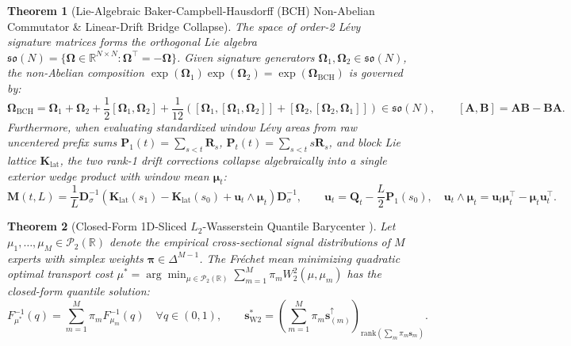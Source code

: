 \documentclass[10pt,a4paper]{article}
\newtheorem{theorem}{Theorem}[section]
\begin{document}
\begin{theorem}[Lie-Algebraic Baker-Campbell-Hausdorff (BCH) Non-Abelian Commutator \& Linear-Drift Bridge Collapse]
The space of order-2 Lévy signature matrices forms the orthogonal Lie algebra $\mathfrak{so}(N) = \{\boldsymbol{\Omega} \in \mathbb{R}^{N \times N} : \boldsymbol{\Omega}^\top = -\boldsymbol{\Omega}\}$. Given signature generators $\boldsymbol{\Omega}_1, \boldsymbol{\Omega}_2 \in \mathfrak{so}(N)$, the non-Abelian composition $\exp(\boldsymbol{\Omega}_1)\exp(\boldsymbol{\Omega}_2) = \exp(\boldsymbol{\Omega}_{\mathrm{BCH}})$ is governed by:
\begin{equation}
  \boldsymbol{\Omega}_{\mathrm{BCH}} = \boldsymbol{\Omega}_1 + \boldsymbol{\Omega}_2 + \frac{1}{2}[\boldsymbol{\Omega}_1, \boldsymbol{\Omega}_2] + \frac{1}{12}\left([\boldsymbol{\Omega}_1, [\boldsymbol{\Omega}_1, \boldsymbol{\Omega}_2]] + [\boldsymbol{\Omega}_2, [\boldsymbol{\Omega}_2, \boldsymbol{\Omega}_1]]\right) \in \mathfrak{so}(N), \qquad [\mathbf{A}, \mathbf{B}] = \mathbf{A}\mathbf{B} - \mathbf{B}\mathbf{A}.
\end{equation}
Furthermore, when evaluating standardized window Lévy areas from raw uncentered prefix sums $\mathbf{P}_1(t) = \sum_{s < t} \mathbf{R}_s$, $\mathbf{P}_t(t) = \sum_{s < t} s \mathbf{R}_s$, and block Lie lattice $\mathbf{K}_{\mathrm{lat}}$, the two rank-1 drift corrections collapse algebraically into a single exterior wedge product with window mean $\boldsymbol{\mu}_t$:
\begin{equation}
  \mathbf{M}(t, L) = \frac{1}{L}\mathbf{D}_{\sigma}^{-1}\left(\mathbf{K}_{\mathrm{lat}}(s_1) - \mathbf{K}_{\mathrm{lat}}(s_0) + \mathbf{u}_t \wedge \boldsymbol{\mu}_t\right)\mathbf{D}_{\sigma}^{-1}, \qquad \mathbf{u}_t = \mathbf{Q}_t - \frac{L}{2}\mathbf{P}_1(s_0), \quad \mathbf{u}_t \wedge \boldsymbol{\mu}_t = \mathbf{u}_t \boldsymbol{\mu}_t^\top - \boldsymbol{\mu}_t \mathbf{u}_t^\top.
\end{equation}
\end{theorem}

\begin{theorem}[Closed-Form 1D-Sliced $L_2$-Wasserstein Quantile Barycenter \cite{villani2009}]
Let $\mu_1, \dots, \mu_M \in \mathcal{P}_2(\mathbb{R})$ denote the empirical cross-sectional signal distributions of $M$ experts with simplex weights $\boldsymbol{\pi} \in \Delta^{M-1}$. The Fréchet mean minimizing quadratic optimal transport cost $\mu^* = \arg\min_{\mu \in \mathcal{P}_2(\mathbb{R})} \sum_{m=1}^M \pi_m W_2^2(\mu, \mu_m)$ has the closed-form quantile solution:
\begin{equation}
  F_{\mu^*}^{-1}(q) = \sum_{m=1}^M \pi_m F_{\mu_m}^{-1}(q) \quad \forall q \in (0, 1), \qquad \mathbf{s}_{\mathrm{W2}}^* = \left(\sum_{m=1}^M \pi_m \mathbf{s}_{(m)}^{\uparrow}\right)_{\mathrm{rank}(\sum_m \pi_m \mathbf{s}_m)}.
\end{equation}
\end{theorem}
\end{document}
